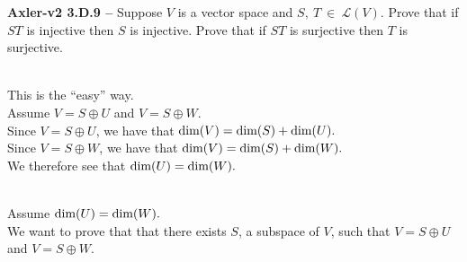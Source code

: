 \noindent \underline{\hspace{6.5in}}
{\bf Axler-v2 3.D.9 --}
Suppose $V$ is a vector space and $S,~T~\in~\mathcal{L}(V)$.  
Prove that if $ST$ is injective then $S$ is injective.
Prove that if $ST$ is surjective then $T$ is surjective.
\vspace*{-.3cm}

\noindent \underline{\hspace{6.5in}}
\vspace*{.3cm}

\noindent

\noindent \framebox{$\Rightarrow$}\\
This is the ``easy'' way.\\
Assume $V = S \oplus U$ and $V = S \oplus W$.\\
Since $V = S \oplus U$, we have that $\textmd{dim}(V) =\textmd{dim}(S) +\textmd{dim}(U).$\\
Since $V = S \oplus W$, we have that $\textmd{dim}(V) =\textmd{dim}(S) +\textmd{dim}(W).$\\
We therefore see that $\textmd{dim}(U) = \textmd{dim}(W).$

\noindent \framebox{$\Leftarrow$}\\
Assume $\textmd{dim}(U) = \textmd{dim}(W).$\\
{\color{blue} We want to prove that that there exists $S$, a subspace of $V$, such that $V = S \oplus U$ and $V = S \oplus W$.}\\

